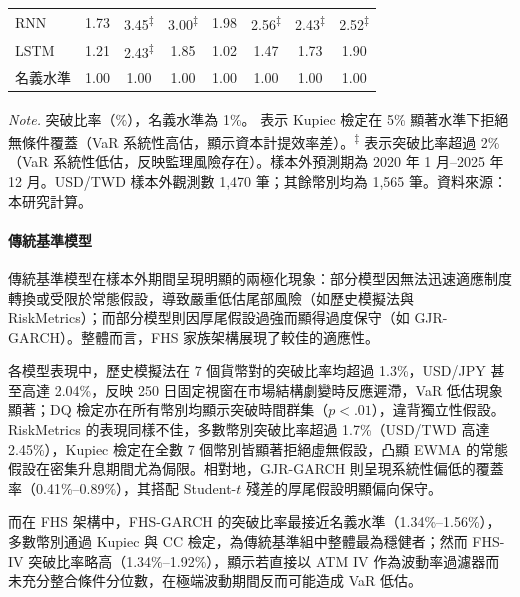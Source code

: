 \begin{table}[htbp]
{\begin{tabular}{lccccccc}
        RNN             & 1.73 & 3.45\textsuperscript{$\ddagger$} & 3.00\textsuperscript{$\ddagger$} & 1.98 & 2.56\textsuperscript{$\ddagger$} & 2.43\textsuperscript{$\ddagger$} & 2.52\textsuperscript{$\ddagger$} \\
        LSTM            & 1.21 & 2.43\textsuperscript{$\ddagger$} & 1.85 & 1.02 & 1.47 & 1.73 & 1.90 \\
        \hline
        名義水準 & 1.00 & 1.00 & 1.00 & 1.00 & 1.00 & 1.00 & 1.00 \\
        \hline
    \end{tabular}}

    \vspace{3mm}

    \begin{minipage}{\textwidth}
        \fontsize{9pt}{13pt}\selectfont
        \textit{Note.} 突破比率（\%），名義水準為 1\%。
        \textsuperscript{\dag} 表示 Kupiec 檢定在 5\% 顯著水準下拒絕無條件覆蓋（VaR 系統性高估，顯示資本計提效率差）。\textsuperscript{$\ddagger$} 表示突破比率超過 2\%（VaR 系統性低估，反映監理風險存在）。樣本外預測期為 2020 年 1 月--2025 年 12 月。USD/TWD 樣本外觀測數 1{,}470 筆；其餘幣別均為 1{,}565 筆。資料來源：本研究計算。
    \end{minipage}
\end{table}


\paragraph{傳統基準模型}\label{sec:perf_benchmark}

傳統基準模型在樣本外期間呈現明顯的兩極化現象：部分模型因無法迅速適應制度轉換或受限於常態假設，導致嚴重低估尾部風險（如歷史模擬法與 RiskMetrics）；而部分模型則因厚尾假設過強而顯得過度保守（如 GJR-GARCH）。整體而言，FHS 家族架構展現了較佳的適應性。

各模型表現中，歷史模擬法在 7 個貨幣對的突破比率均超過 1.3\%，USD/JPY 甚至高達 2.04\%，反映 250 日固定視窗在市場結構劇變時反應遲滯，VaR 低估現象顯著；DQ 檢定亦在所有幣別均顯示突破時間群集（$p < .01$），違背獨立性假設。RiskMetrics 的表現同樣不佳，多數幣別突破比率超過 1.7\%（USD/TWD 高達 2.45\%），Kupiec 檢定在全數 7 個幣別皆顯著拒絕虛無假設，凸顯 EWMA 的常態假設在密集升息期間尤為侷限。相對地，GJR-GARCH 則呈現系統性偏低的覆蓋率（0.41\%–0.89\%），其搭配 Student-$t$ 殘差的厚尾假設明顯偏向保守。

而在 FHS 架構中，FHS-GARCH 的突破比率最接近名義水準（1.34\%–1.56\%），多數幣別通過 Kupiec 與 CC 檢定，為傳統基準組中整體最為穩健者；然而 FHS-IV 突破比率略高（1.34\%–1.92\%），顯示若直接以 ATM IV 作為波動率過濾器而未充分整合條件分位數，在極端波動期間反而可能造成 VaR 低估。

